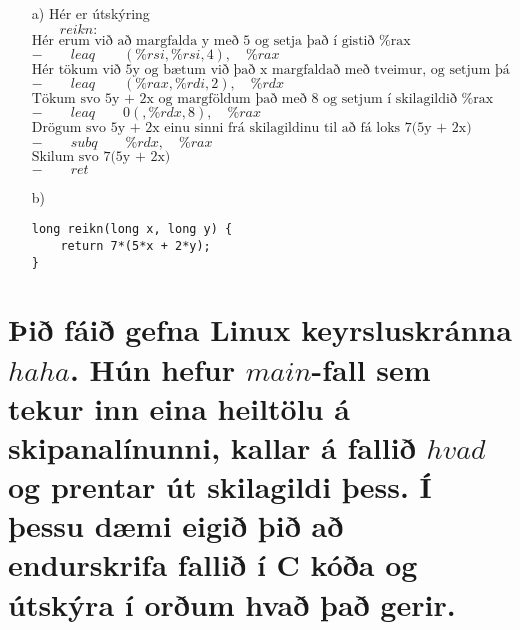 \documentclass{article}
\begin{document}
	\begin{itemize}
		\item[a)] Hér er útskýring \vspace{1em} \\ $\hspace{2em} reikn:$ \\
			$\text{Hér erum við að margfalda y með 5 og setja það í gistið 
			\%rax}$ \\
	$- \hspace{2em} leaq \hspace{2em} (\%rsi,\%rsi,4),\hspace{1em}\%rax$ \\
			$\text{Hér tökum við 5y og bætum við það x margfaldað með 
			tveimur, og setjum þá 5y + 2x í \%rdx}$ \\
	$- \hspace{2em} leaq \hspace{2em} (\%rax,\%rdi,2),\hspace{1em}\%rdx$ \\
			$\text{Tökum svo 5y + 2x og margföldum það með 8 og setjum í 
			skilagildið \%rax}$ \\
	$- \hspace{2em} leaq \hspace{2em} 0(,\%rdx,8),\hspace{1em}\%rax$ \\
			$\text{Drögum svo 5y + 2x einu sinni frá skilagildinu til að 
			fá loks 7(5y + 2x)}$ \\
	$- \hspace{2em} subq \hspace{2em} \%rdx,\hspace{1em}\%rax$ \\
			$\text{Skilum svo 7(5y + 2x)}$ \\
	$- \hspace{2em} ret$
		\item[b)] 
			\begin{verbatim}
long reikn(long x, long y) {
    return 7*(5*x + 2*y);
}
			\end{verbatim}
	\end{itemize}

	\section{Þið fáið gefna Linux keyrsluskránna $haha$. Hún hefur 
		$main$-fall sem tekur inn eina heiltölu á skipanalínunni, kallar á 
		fallið $hvad$ og prentar út skilagildi þess. Í þessu dæmi eigið þið 
		að endurskrifa fallið í C kóða og útskýra í orðum hvað það gerir.}
\end{document}
